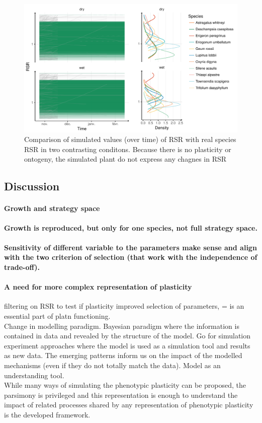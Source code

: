 \begin{figure}\label{fig:comparison_RSR}
\includegraphics[width = \textwidth]{./2_PP/Figures/RSR_full_sim.pdf}
\caption{Comparison of simulated values (over time) of RSR with real species RSR in two contrasting conditons. Because there is no plasticity or ontogeny, the simulated plant do not express any chagnes in RSR}
\end{figure}

\subsection{Discussion}

\paragraph{Growth and strategy space}

\textbf{Growth is reproduced, but only for one species, not full strategy space.}

\paragraph{}

\textbf{Sensitivity of different variable to the parameters make sense and align with the two criterion of selection (that work with the independence of trade-off).}

\paragraph{A need for more complex representation of plasticity}

filtering on RSR to test if plasticity improved selection of parameters, = is an essential part of platn functioning.\\
Change in modelling paradigm. Bayesian paradigm where the information is contained in data and revealed by the structure of the model. Go for simulation experiment approaches where the model is used as a simulation tool and results as new data. The emerging patterns inform us on the impact of the modelled mechanisms (even if they do not totally match the data). Model as an understanding tool.\\
While many ways of simulating the phenotypic plasticity can be proposed, the parsimony is privileged and this representation is enough to understand the impact of related processes shared by any representation of phenotypic plasticity is the developed framework.

